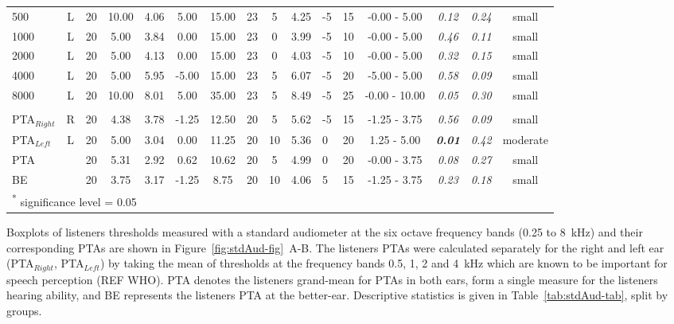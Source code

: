 \documentclass[a4paper, twoside]{templates/ociamthesis}
\begin{document}
\begin{table}
{\begin{tabular}[t]{lcccccc|>{}ccclc|>{}c>{}c>{}cc}
\hspace{1em}500 & L & 20 & 10.00 & 4.06 & 5.00 & 15.00 & 23 & 5 & 4.25 & -5 & 15 & -0.00 - 5.00 & \em{0.12} & \em{0.24} & small\\
\hspace{1em}1000 & L & 20 & 5.00 & 3.84 & 0.00 & 15.00 & 23 & 0 & 3.99 & -5 & 10 & -0.00 - 5.00 & \em{0.46} & \em{0.11} & small\\
\hspace{1em}2000 & L & 20 & 5.00 & 4.13 & 0.00 & 15.00 & 23 & 0 & 4.03 & -5 & 10 & -0.00 - 5.00 & \em{0.32} & \em{0.15} & small\\
\hspace{1em}4000 & L & 20 & 5.00 & 5.95 & -5.00 & 15.00 & 23 & 5 & 6.07 & -5 & 20 & -5.00 - 5.00 & \em{0.58} & \em{0.09} & small\\
\hspace{1em}8000 & L & 20 & 10.00 & 8.01 & 5.00 & 35.00 & 23 & 5 & 8.49 & -5 & 25 & -0.00 - 10.00 & \em{0.05} & \em{0.30} & small\\
\addlinespace[0.3em]
\multicolumn{16}{l}{\textbf{PTAs and better-ear}}\\
\hspace{1em}PTA$_{Right}$ & R & 20 & 4.38 & 3.78 & -1.25 & 12.50 & 20 & 5 & 5.62 & -5 & 15 & -1.25 - 3.75 & \em{0.56} & \em{0.09} & small\\
\hspace{1em}PTA$_{Left}$ & L & 20 & 5.00 & 3.04 & 0.00 & 11.25 & 20 & 10 & 5.36 & 0 & 20 & 1.25 - 5.00 & \em{\textbf{0.01}} & \em{0.42} & moderate\\
\hspace{1em}PTA &  & 20 & 5.31 & 2.92 & 0.62 & 10.62 & 20 & 5 & 4.99 & 0 & 20 & -0.00 - 3.75 & \em{0.08} & \em{0.27} & small\\
\hspace{1em}BE &  & 20 & 3.75 & 3.17 & -1.25 & 8.75 & 20 & 10 & 4.06 & 5 & 15 & -1.25 - 3.75 & \em{0.23} & \em{0.18} & small\\
\bottomrule
\multicolumn{16}{l}{\textsuperscript{*} significance level = 0.05}\\
\end{tabular}}
\end{table}

Boxplots of listeners thresholds measured with a standard audiometer at the six octave frequency bands (0.25 to 8~kHz) and their corresponding PTAs are shown in Figure~\ref{fig:stdAud-fig}~A-B. The listeners PTAs were calculated separately for the right and left ear (PTA\(_{Right}\), PTA\(_{Left}\)) by taking the mean of thresholds at the frequency bands 0.5, 1, 2 and 4~kHz which are known to be important for speech perception (REF WHO). PTA denotes the listeners grand-mean for PTAs in both ears, form a single measure for the listeners hearing ability, and BE represents the listeners PTA at the better-ear. Descriptive statistics is given in Table~\ref{tab:stdAud-tab}, split by groups.
\end{document}
